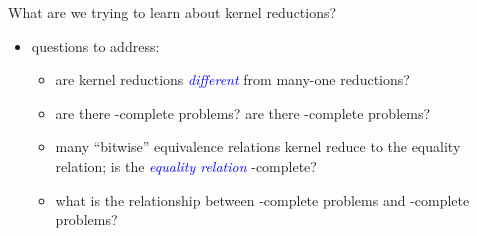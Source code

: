 \documentclass[final]{beamer}
\newcommand{\emphblue}[1]{\emph{\textcolor{blue}{#1}}}
\begin{document}
\begin{frame}{}
\begin{columns}[t]
\begin{column}{.3\linewidth}
      \vspace{1.8in}

      \begin{block}{\LARGE What are we trying to learn about kernel
          reductions?}
        \begin{itemize}\Large
        \item questions to address:
          \begin{itemize}\Large
          \item are kernel reductions \emphblue{different} from many-one
            reductions?
          \item are there \PEq-complete problems? are there \NPEq-complete
            problems?
          \item many ``bitwise'' equivalence relations kernel reduce to the
            equality relation; is the \emphblue{equality relation}
            \PEq-complete?
          \item what is the relationship between \NP-complete problems and
            \NPEq-complete problems?
          \end{itemize}
        \end{itemize}
      \end{block}

    \end{column}

  \end{columns}
\end{frame}
\end{document}
